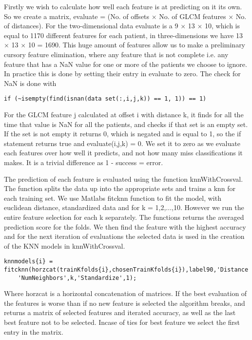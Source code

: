 Firstly we wish to calculate how well each feature is at predicting on it its own. So we create a matrix, evaluate = (No. of offsets $\times$ No. of GLCM features $\times$ No. of distances). For the two-dimensional data evaluate is a 9 $\times$ 13  $\times$ 10, which is equal to 1170 different features for each patient, in three-dimensions we have 13 $\times$  13  $\times$  10 = 1690. This huge amount of features allow us to make a preliminary cursory feature elimination, where any feature that is not complete i.e. any feature that has a NaN value for one or more of the patients we choose to ignore. In practice this is done by setting their entry in evaluate to zero. The check for NaN is done with
\begin{lstlisting}[mathescape=true]
	if (~isempty(find(isnan(data set(:,i,j,k)) == 1, 1)) == 1)
\end{lstlisting}
For the GLCM feature j calculated at offset i with distance k, it finds for all the time that value is NaN for all the patients, and checks if that set is an empty set. If the set is not empty it returns 0, which is negated and is equal to 1, so the if statement returns true and evaluate(i,j,k) = 0. We set it to zero as we evaluate each features over how well it predicts, and not how many miss classifications it makes. It is a trivial difference as 1 - success = error.

The prediction of each feature is evaluated using the function knnWithCrossval. The function splits the data up into the appropriate sets and trains a knn for each training set. We use Matlabs fitcknn function to fit the model, with euclidean distance, standardized data and for k = 1,2,...,10. However we run the entire feature selection for each k separately. The functions returns the averaged prediction score for the folds.
We then find the feature with the highest accuracy and for the next iteration of evaluations the selected data is used in the creation of the KNN models in knnWithCrossval.
\begin{lstlisting}[mathescape=true]
    knnmodels{i} = fitcknn(horzcat(trainKfolds{i},chosenTrainKfolds{i}),label90,'Distance','euclidean',...
    'NumNeighbors',k,'Standardize',1);
\end{lstlisting}
Where horzcat is a horizontal concatenation of matrices.
If the best evaluation of the features is worse than if no new feature is selected the algorithm breaks, and returns a matrix of selected features and iterated accuracy, as well as the last best feature not to be selected.
Incase of ties for best feature we select the first entry in the matrix.


